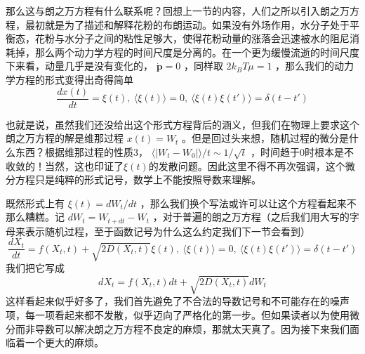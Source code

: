 \documentclass{ctexart}
\begin{document}
那么这与朗之万方程有什么联系呢？回想上一节的内容，人们之所以引入朗之万方程，最初就是为了描述和解释花粉的布朗运动。如果没有外场作用，水分子处于平衡态，花粉与水分子之间的粘性足够大，使得花粉动量的涨落会迅速被水的阻尼消耗掉，那么两个动力学方程的时间尺度是分离的。在一个更为缓慢流逝的时间尺度下来看，动量几乎是没有变化的， $\dot{\bm{p}}=0$ ，同样取 $2k_BT\mu=1$ ，那么我们的动力学方程的形式变得出奇得简单
\begin{equation}
\frac{dx(t)}{dt}=\xi(t),\ \langle\xi(t)\rangle=0,\ \langle\xi(t)\xi(t')\rangle=\delta(t-t')
\end{equation}

也就是说，虽然我们还没给出这个形式方程背后的涵义，但我们在物理上要求这个朗之万方程的解是维那过程 $x(t)=W_t$ 。但是回过头来想，随机过程的微分是什么东西？根据维那过程的性质3， $\langle|W_t-W_0|\rangle/t\sim 1/\sqrt{t}$ ，时间趋于0时根本是不收敛的！当然，这也印证了$\xi(t)$的发散问题。因此这里不得不再次强调，这个微分方程只是纯粹的形式记号，数学上不能按照导数来理解。

既然形式上有 $\xi(t)=dW_t/dt$ ，那么我们换个写法或许可以让这个方程看起来不那么糟糕。记  $dW_t=W_{t+dt}-W_t$ ，对于普遍的朗之万方程（之后我们用大写的字母来表示随机过程，至于函数记号为什么这么约定我们下一节会看到）
\begin{equation}
\frac{dX_t}{dt}=f(X_t,t)+\sqrt{2D(X_t,t)}\xi(t),\ \langle\xi(t)\rangle=0,\ \langle\xi(t)\xi(t')\rangle=\delta(t-t')
\end{equation}
我们把它写成
\begin{equation}
dX_t=f(X_t,t)dt+\sqrt{2D(X_t,t)}dW_t
\end{equation}
这样看起来似乎好多了，我们首先避免了不合法的导数记号和不可能存在的噪声项，每一项看起来都不发散，似乎迈向了严格化的第一步。但如果读者以为使用微分而非导数可以解决朗之万方程不良定的麻烦，那就太天真了。因为接下来我们面临着一个更大的麻烦。
\end{document}
